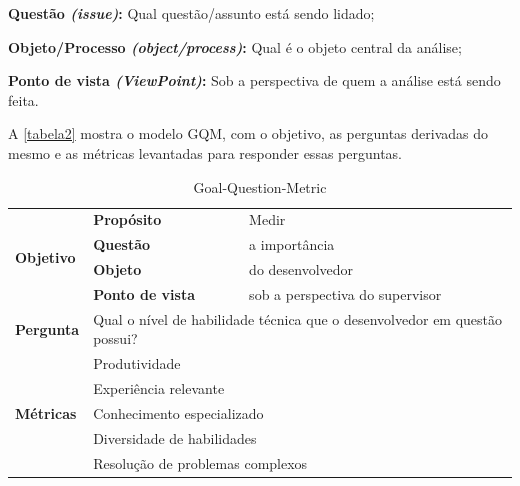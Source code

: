 \begin{alineas}
	\item \textbf{Questão \textit{(issue)}:} Qual questão/assunto está sendo lidado;
	\item \textbf{Objeto/Processo \textit{(object/process)}:} Qual é o objeto central da análise;
	\item \textbf{Ponto de vista \textit{(ViewPoint)}:} Sob a perspectiva de quem a análise está sendo feita.
\end{alineas}
	
A \autoref{tabela2} mostra o modelo GQM, com o objetivo, as perguntas derivadas do mesmo e as métricas levantadas para responder essas perguntas.


\begin{table}[h]
	\footnotesize
	\caption{Goal-Question-Metric}
	\label{tabela2}
	\def\arraystretch{1.5}
	\begin{tabular}{|p{2cm}|p{6.25cm}|p{6.25cm}|}
		\hline
		\multirow{4}{*}{\textbf{Objetivo}} & \textbf{Propósito}                              & Medir                                                 \\ \cline{2-3} 
		& \textbf{Questão}                                & a importância                                         \\ \cline{2-3} 
		& \textbf{Objeto}                                 & do desenvolvedor                                      \\ \cline{2-3} 
		& \textbf{Ponto de vista}                         & sob a perspectiva do supervisor                       \\ \hline
		
		
		\textbf{Pergunta}                  & \multicolumn{2}{l|}{\parbox{12cm}{ Qual o nível de habilidade técnica que o desenvolvedor em questão possui?}}          \\ \hline
		\multirow{5}{*}{\textbf{Métricas}} 
		& \multicolumn{2}{l|}{Produtividade}                                                              \\ \cline{2-3} 
		& \multicolumn{2}{l|}{Experiência relevante}                                                              \\ \cline{2-3} 
		& \multicolumn{2}{l|}{Conhecimento especializado}                                                         \\ \cline{2-3} 
		& \multicolumn{2}{l|}{Diversidade de habilidades}                                                         \\ \cline{2-3} 
		& \multicolumn{2}{l|}{Resolução de problemas complexos}                                                   \\ \hline\hline
		

\end{tabular}
\end{table}
